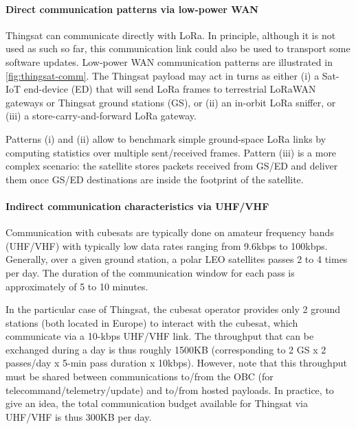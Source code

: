 \paragraph*{Direct communication patterns via low-power WAN}
Thingsat can communicate directly with LoRa. %
In principle, although it is not used as such so far, this communication link could also be used to transport some software updates.
Low-power WAN communication patterns are illustrated in \autoref{fig:thingsat-comm}.
The Thingsat payload may act in turns as either 
(i) a Sat-IoT end-device (ED) that will send LoRa frames to terrestrial LoRaWAN gateways or Thingsat ground stations (GS), or 
(ii) an in-orbit LoRa sniffer, or 
(iii) a store-carry-and-forward LoRa gateway.

Patterns (i) and (ii) allow to benchmark simple ground-space LoRa links by
computing statistics over multiple sent/received frames. 
Pattern (iii) is a more
complex scenario: the satellite stores packets received from GS/ED and deliver
them once GS/ED destinations are inside the footprint of the satellite.

\paragraph*{Indirect communication characteristics via UHF/VHF}
Communication with cubesats are typically done on amateur frequency
bands (UHF/VHF) with typically low data rates ranging from 9.6kbps to
100kbps. 
Generally, over a given ground station, a polar LEO satellites passes 2 to 4 times per day. The duration of the communication window for each pass is approximately of 5 to 10 minutes. 

In the particular case of Thingsat, the cubesat operator provides only 2 ground stations (both located in Europe) to interact with the cubesat, which communicate via a 10-kbps UHF/VHF link.
The throughput that can be exchanged during a day is thus roughly 1500KB (corresponding to 2 GS x 2
passes/day x 5-min pass duration x 10kbps).
 However, note that this throughput must be shared between communications to/from the OBC
(for telecommand/telemetry/update) and to/from hosted payloads. 
In practice, to give an
idea, the total communication budget available for Thingsat via UHF/VHF is thus 300KB per day. %

